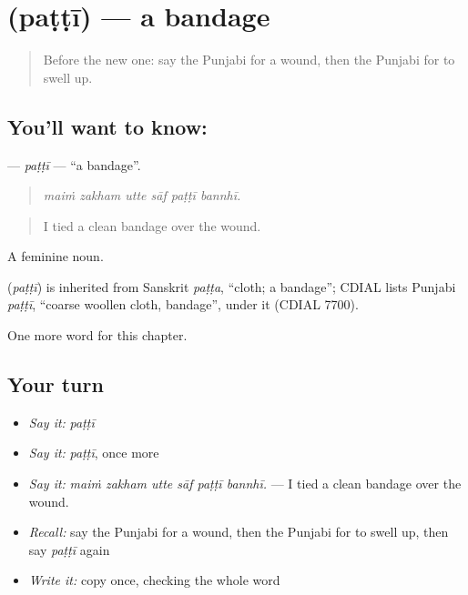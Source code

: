 \section[\texorpdfstring{\pa{ਪੱਟੀ} (paṭṭī)}{ਪੱਟੀ (paṭṭī)}]{ (paṭṭī) — a bandage}

\label{lesson:PA-C322-patti}



\begin{quote}
Before the new one: say the Punjabi for a wound, then the Punjabi for to swell up.
\end{quote}

\subsection*{You'll want to know: }
\textbf{} — \emph{paṭṭī} — \textquotedblleft{}a bandage\textquotedblright{}.

\begin{quote}
     
\end{quote}

\begin{quote}
\emph{maiṁ zakham utte sāf paṭṭī bannhī.}
\end{quote}

\begin{quote}
I tied a clean bandage over the wound.
\end{quote}

A feminine noun.

\begin{cousinweb}
\textbf{} (\emph{paṭṭī}) is inherited from Sanskrit \emph{paṭṭa}, \textquotedblleft{}cloth; a bandage\textquotedblright{}; CDIAL lists Punjabi \emph{paṭṭī}, \textquotedblleft{}coarse woollen cloth, bandage\textquotedblright{}, under it (CDIAL 7700).
\end{cousinweb}

\begin{grammarlens}[title={What you've built}]
One more word for this chapter.
\end{grammarlens}

\subsection*{Your turn}
\begin{itemize}
\raggedright
  \item \emph{Say it:} \emph{paṭṭī}
  \item \emph{Say it:} \emph{paṭṭī}, once more
  \item \emph{Say it:} \emph{maiṁ zakham utte sāf paṭṭī bannhī.} — I tied a clean bandage over the wound.
  \item \emph{Recall:} say the Punjabi for a wound, then the Punjabi for to swell up, then say \emph{paṭṭī} again
  \item \emph{Write it:} copy \textbf{} once, checking the whole word
\end{itemize}

